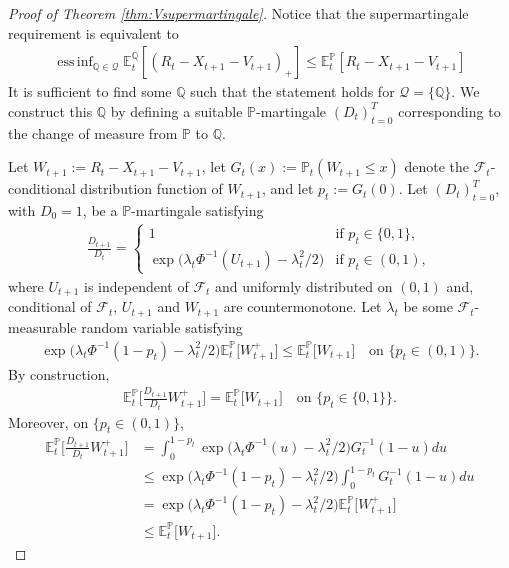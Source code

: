 \documentclass[11pt,a4paper]{article}
\newcommand{\E}{\mathbb{E}}
\DeclareMathOperator*{\essinf}{ess\,inf}
\renewcommand{\P}{\mathbb{P}}
\newcommand{\Q}{\mathbb{Q}}
\newcommand{\calF}{\mathcal{F}}
\newcommand{\calQ}{\mathcal{Q}}
\begin{document}
\begin{proof}[Proof of Theorem \ref{thm:Vsupermartingale}]
Notice that the supermartingale requirement is equivalent to 
\begin{align}\label{eq:ineq}
\essinf_{\Q\in\mathcal{Q}}\E^{\Q}_t[(R_t-X_{t+1}-V_{t+1})_+]\leq \E^{\P}_t[R_t-X_{t+1}-V_{t+1}]
\end{align}
It is sufficient to find some $\Q$ such that the statement holds for $\calQ=\{\Q\}$. 
We construct this $\Q$ by defining a suitable $\P$-martingale $(D_{t})_{t=0}^T$ corresponding to the change of measure from $\P$ to $\Q$. 

Let $W_{t+1}:=R_t-X_{t+1}-V_{t+1}$, let $G_t(x):=\P_t(W_{t+1}\leq x)$ denote the $\calF_{t}$-conditional distribution function of $W_{t+1}$, and let $p_t:=G_t(0)$. Let $(D_{t})_{t=0}^T$, with $D_0=1$, be a $\P$-martingale satisfying 
\begin{align*}
\frac{D_{t+1}}{D_t}=
\left\{\begin{array}{ll}
1 & \text{if } p_t\in\{0,1\},\\
\exp\big(\lambda_t\Phi^{-1}(U_{t+1})-\lambda_t^2/2\big) & \text{if } p_t\in (0,1),
\end{array}\right.
\end{align*}
where $U_{t+1}$ is independent of $\calF_t$ and uniformly distributed on $(0,1)$ and, conditional of $\calF_t$, $U_{t+1}$ and $W_{t+1}$ are countermonotone. Let $\lambda_t$ be some $\calF_t$-measurable random variable satisfying 
\begin{align*}
\exp\big(\lambda_t \Phi^{-1}(1-p_t)-\lambda_t^2/2\big)\E^{\P}_t\big[W_{t+1}^+\big]\leq \E^{\P}_t\big[W_{t+1}\big]
\quad \text{on } \{p_t \in (0,1)\}.
\end{align*}
By construction, 
\begin{align*}
\E^{\P}_t\bigg[\frac{D_{t+1}}{D_t}W_{t+1}^+\bigg]=\E^{\P}_t\big[W_{t+1}\big] 
\quad \text{on } \{p_t \in \{0,1\}\}.
\end{align*}
Moreover, on $\{p_t\in (0,1)\}$, 
\begin{align*}
\E^{\P}_t\bigg[\frac{D_{t+1}}{D_t}W_{t+1}^+\bigg]
&=\int_0^{1-p_t}\exp\big(\lambda_t \Phi^{-1}(u)-\lambda_t^2/2\big)G_{t}^{-1}(1-u)du\\
&\leq \exp\big(\lambda_t \Phi^{-1}(1-p_t)-\lambda_t^2/2\big)\int_0^{1-p_t}G_{t}^{-1}(1-u)du\\
&=\exp\big(\lambda_t \Phi^{-1}(1-p_t)-\lambda_t^2/2\big)\E^{\P}_t\big[W_{t+1}^+\big]\\
&\leq \E^{\P}_t\big[W_{t+1}\big].  
\end{align*}
\end{proof}
\end{document}
